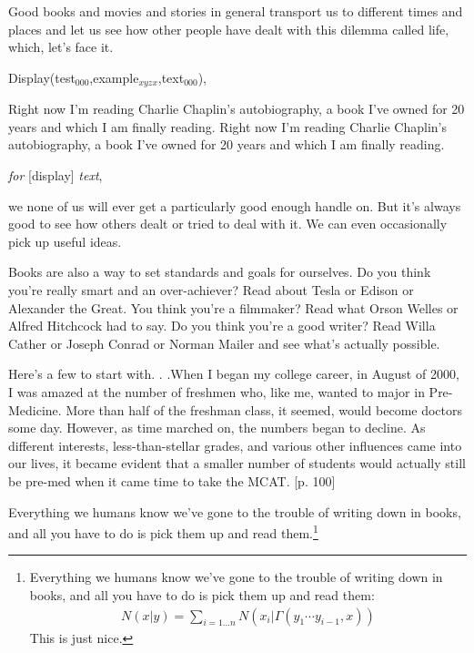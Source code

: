 \documentclass[final]{clv2025}
\begin{document}
Good books and movies and stories in general transport us to different times and places and let us see how other people have dealt with this dilemma called life, which, let's face it.
\begin{displaytext}
Display(test$_{000}$,example$_{xyzx}$,text$_{000}$),
\end{displaytext}
Right now I'm reading Charlie Chaplin's autobiography, a book I've owned for 20 years and which I am finally reading. Right now I'm reading Charlie Chaplin's autobiography, a book I've owned for 20 years and which I am finally reading.
\begin{displaytext}
[test] {\em for} [display] {\em text},
\end{displaytext}
we none of us will ever get a particularly good enough handle on. But it's always good to see how others dealt or tried to deal with it. We can even occasionally pick up useful ideas.

Books are also a way to set standards and goals for ourselves. Do you think you're really smart and an over-achiever? Read about Tesla or Edison or Alexander the Great. You think you're a filmmaker? Read what Orson Welles or Alfred Hitchcock had to say. Do you think you're a good writer? Read Willa Cather or Joseph Conrad or Norman Mailer and see what's actually possible.
\begin{extract}
Here's a few to start with. . .When I began my college career, in August of 2000, I was amazed at the number of freshmen who, like me, wanted to major in Pre-Medicine. More than half of the freshman class, it seemed, would become doctors some day. However, as time marched on, the numbers began to decline. As different interests, less-than-stellar grades, and various other influences came into our lives, it became evident that a smaller number of students would actually still be pre-med when it came time to take the MCAT. [p. 100]
\end{extract}
Everything we humans know we've gone to the trouble of writing down in books, and all you have to do is pick them up and read them.\footnote{Everything we humans know we've gone to the trouble of writing down in books, and all you have to do is pick them up and read them:
\begin{align}
N(x|y)=\sum_{i=1\dots n}N(x_i|\Gamma(y_1\cdots y_{i-1},x)) \nonumber
\end{align}
This is just nice.
}
\end{document}
